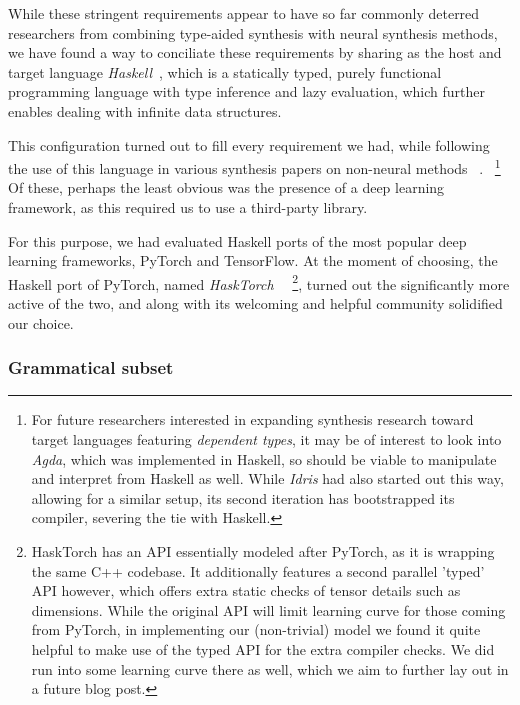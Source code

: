 \documentclass{article}
\begin{document}
While these stringent requirements appear to have so far commonly deterred
researchers from combining type-aided synthesis with neural synthesis methods,
we have found a way to conciliate these requirements
by sharing as the host and target language
\emph{Haskell}~\citep{jones2003haskell}, which is a statically typed,
purely functional programming language with type inference and lazy evaluation,
which further enables dealing with infinite data structures.

This configuration turned out to fill every requirement we had,
while following the use of this language in various synthesis papers on non-neural methods%
~\citep{synquid,hornclauses,scythe,gissurarson2018suggesting}.%
~\footnote{
    For future researchers interested in expanding synthesis research toward target languages featuring \emph{dependent types},
    it may be of interest to look into \emph{Agda},
    which was implemented in Haskell,
    so should be viable to manipulate and interpret from Haskell as well.
    While \emph{Idris} had also started out this way,
    allowing for a similar setup,
    its second iteration has bootstrapped its compiler,
    severing the tie with Haskell.
}
Of these, perhaps the least obvious was the presence of a deep learning framework,
as this required us to use a third-party library.

For this purpose, we had evaluated Haskell ports of
the most popular deep learning frameworks, PyTorch and TensorFlow.
At the moment of choosing, the Haskell port of PyTorch,
named \emph{HaskTorch}~\citep{hasktorch}%
~\footnote{
    HaskTorch has an API essentially modeled after PyTorch, as it is wrapping the same C++ codebase.
    It additionally features a second parallel 'typed' API however,
    which offers extra static checks of tensor details such as dimensions.
    While the original API will limit learning curve for those coming from PyTorch,
    in implementing our (non-trivial) model we found it quite helpful
    to make use of the typed API for the extra compiler checks.
    We did run into some learning curve there as well,
    which we aim to further lay out in a future blog post.
},
turned out the significantly more active of the two,
and along with its welcoming and helpful community solidified our choice.

\subsubsection{Grammatical subset} \label{sec:subset}
\end{document}
